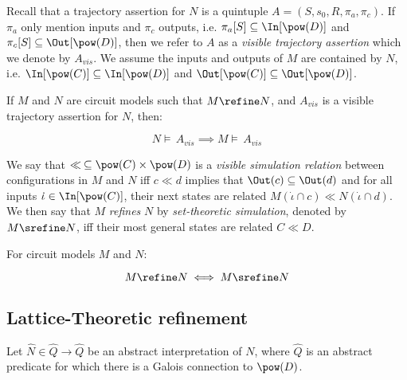 Recall that a trajectory assertion for $N$ is a quintuple $A = (S,s_{0},R,\pi_{a},\pi_{c})$. If $\pi_{a}$ only mention inputs and $\pi_{c}$ outputs, i.e. $\pi_{a}[S] \subseteq \In[\pow(D)]$ and $\pi_{c}[S] \subseteq \Out[\pow(D)]$, then we refer to $A$ as a \textit{visible trajectory assertion} which we denote by $A_{vis}$. We assume the inputs and outputs of $M$ are contained by $N$, i.e. $\In[\pow(C)] \subseteq \In[\pow(D)]$ and $\Out[\pow(C)] \subseteq \Out[\pow(D)]$.


\begin{theorem} \label{thm:refinement-set}
If $M$ and $N$ are circuit models such that $M \refine N$, and $A_{vis}$ is a visible trajectory assertion for $N$, then:

\begin{equation*}
N \models \, A_{vis} \implies M \models \, A_{vis}
\end{equation*}
\end{theorem}

We say that $\ll \: \subseteq \pow(C) \times \pow(D)$ is a \textit{visible simulation relation} between configurations in $M$ and $N$ iff $c \ll d$ implies that $\Out(c) \subseteq \Out(d)$ and for all inputs $\dot \iota \in \In[\pow(C)]$, their next states are related $M(\dot \iota \cap c) \ll N(\dot \iota \cap d)$. We then say that $M$ \textit{refines} $N$ by \textit{set-theoretic simulation}, denoted by $M \srefine N$, iff their most general states are related $C \ll D$.

\begin{theorem} \label{thm:refinement-set-impl}
For circuit models $M$ and $N$:

\begin{equation*}
M \refine N \iff M \srefine N
\end{equation*}
\end{theorem}

\subsection{Lattice-Theoretic refinement}

Let $\hat N \in \hat Q \rightarrow \hat Q$ be an abstract interpretation of $N$, where $\hat Q$ is an abstract predicate for which there is a Galois connection to $\pow(D)$.

